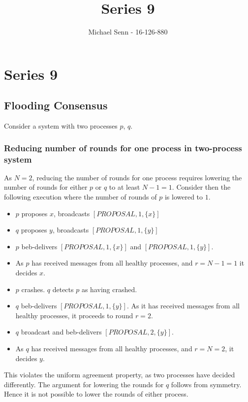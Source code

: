 \documentclass[a4paper]{scrreprt}
\title{Series 9}
\author{Michael Senn \maillink{michael.senn@students.unibe.ch} - 16-126-880}
\date{\printdate}
\begin{document}
\maketitle


\setcounter{chapter}{8}

\chapter{Series 9}

\section{Flooding Consensus}

Consider a system with two processes $p$, $q$.

\subsection{Reducing number of rounds for one process in two-process system}

As $N = 2$, reducing the number of rounds for one process requires lowering the
number of rounds for either $p$ or $q$ to at least $N - 1 = 1$. Consider then
the following execution where the number of rounds of $p$ is lowered to $1$.

\begin{itemize}
	\item $p$ proposes $x$, broadcasts $[PROPOSAL, 1, \{x\}]$
	\item $q$ proposes $y$, broadcasts $[PROPOSAL, 1, \{y\}]$
	\item $p$ beb-delivers $[PROPOSAL, 1, \{x\}]$ and $[PROPOSAL, 1,
		\{y\}]$.
	\item As $p$ has received messages from all healthy processes, and $r =
		N - 1 = 1$ it decides $x$.
	\item $p$ crashes. $q$ detects $p$ as having crashed.
	\item $q$ beb-delivers $[PROPOSAL, 1, \{y\}]$. As it has received
		messages from all healthy processes, it proceeds to round $r =
		2$.
	\item $q$ broadcast and beb-delivers $[PROPOSAL, 2, \{y\}]$.
	\item As $q$ has received messages from all healthy processes, and $r =
		N = 2$, it decides $y$.
\end{itemize}

This violates the uniform agreement property, as two processes have decided
differently. The argument for lowering the rounds for $q$ follows from
symmetry. Hence it is not possible to lower the rounds of either process.
\end{document}
